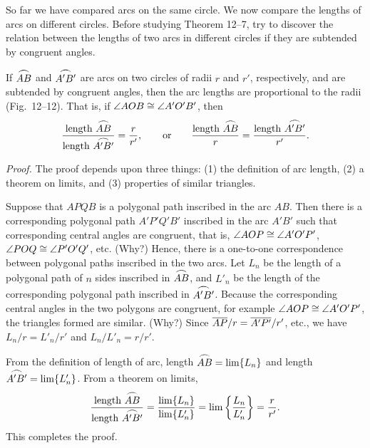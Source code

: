 \documentclass[11pt]{book}
\newcommand{\XIIarc}[1]{\overset{\raisebox{-0.25ex}{\scalebox{1.15}[0.85]{$\frown$}}}{#1}}
\begin{document}
So far we have compared arcs on the same circle. We now compare the lengths of
arcs on different circles. Before studying Theorem 12--7, try to discover the
relation between the lengths of two arcs in different circles if they are
subtended by congruent angles.

\begin{theorem}
If $\XIIarc{AB}$ and $\XIIarc{A'B'}$ are arcs on two circles of radii $r$ and
$r'$, respectively, and are subtended by congruent angles, then the arc lengths
are proportional to the radii (Fig.~12--12). That is, if
$\angle AOB \cong \angle A'O'B'$, then
\[
\frac{\text{length } \XIIarc{AB}}{\text{length } \XIIarc{A'B'}} =
\frac{r}{r'}, \qquad \text{or} \qquad
\frac{\text{length } \XIIarc{AB}}{r} =
\frac{\text{length } \XIIarc{A'B'}}{r'}.
\]
\end{theorem}

\noindent\emph{Proof.} The proof depends upon three things: (1) the definition
of arc length, (2) a theorem on limits, and (3) properties of similar triangles.

Suppose that $APQB$ is a polygonal path inscribed in the arc $AB$. Then there is
a corresponding polygonal path $A'P'Q'B'$ inscribed in the arc $A'B'$ such that
corresponding central angles are congruent, that is,
$\angle AOP \cong \angle A'O'P'$, $\angle POQ \cong \angle P'O'Q'$, etc. (Why?)
Hence, there is a one-to-one correspondence between polygonal paths inscribed in
the two arcs. Let $L_n$ be the length of a polygonal path of $n$ sides inscribed
in $\XIIarc{AB}$, and $L'_n$ be the length of the corresponding polygonal path
inscribed in $\XIIarc{A'B'}$. Because the corresponding central angles in the
two polygons are congruent, for example $\angle AOP \cong \angle A'O'P'$, the
triangles formed are similar. (Why?) Since $\overline{AP}/r = \overline{A'P'}/r'$, etc., we
have $L_n/r = L'_n/r'$ and $L_n/L'_n = r/r'$.

From the definition of length of arc, length $\XIIarc{AB} = \lim \{L_n\}$ and
length $\XIIarc{A'B'} = \lim \{L'_n\}$. From a theorem on limits,
\[
\frac{\text{length } \XIIarc{AB}}{\text{length } \XIIarc{A'B'}} =
\frac{\lim \{L_n\}}{\lim \{L'_n\}} = \lim \left\{\frac{L_n}{L'_n}\right\} =
\frac{r}{r'}.
\]
This completes the proof.
\end{document}
